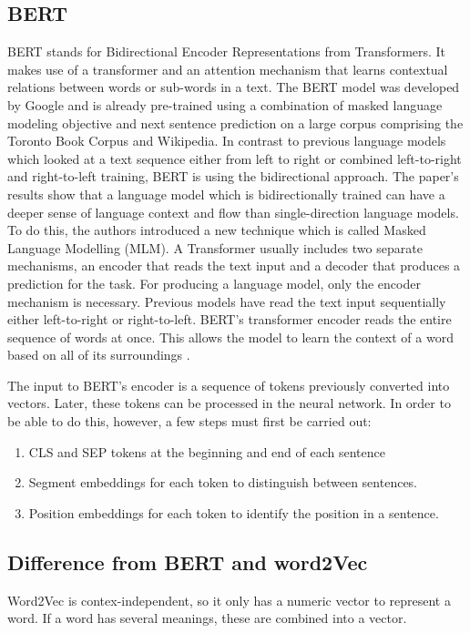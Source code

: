 \subsection{BERT} \label{bert}
BERT  stands  for  Bidirectional Encoder Representations from Transformers.  It makes use of a transformer and an attention mechanism that learns contextual relations between words or sub-words in a text.  The BERT model was developed by Google and is already pre-trained using a combination of masked language modeling objective and next sentence prediction on a large corpus comprising the Toronto Book Corpus and Wikipedia. In contrast to previous language models which looked at a text sequence either from left to right or combined left-to-right and right-to-left training, BERT is using the bidirectional approach. The paper’s results show that a language model which is bidirectionally trained can have a deeper sense of language context and flow than single-direction language models. To do this, the authors introduced a new technique which is called Masked Language Modelling (MLM). \newline
A Transformer usually includes two separate mechanisms, an encoder that reads the text input and a decoder that produces a prediction for the task. For producing a language model, only the encoder mechanism is necessary. Previous models have read the text input sequentially either left-to-right or right-to-left. BERT's transformer encoder reads the entire sequence of words at once. This allows the model to learn the context of a word based on all of its surroundings \cite{Devlin}.  \newline

The input to BERT's encoder is a sequence of tokens previously converted into vectors. Later, these tokens can be processed in the neural network. In order to be able to do this, however, a few steps must first be carried out:
\begin{enumerate}
	\item CLS and SEP tokens at the beginning and end of each sentence
	\item Segment embeddings for each token to distinguish between sentences.
	\item Position embeddings for each token to identify the position in a sentence.
\end{enumerate}

\subsection{Difference from BERT and word2Vec}
Word2Vec is contex-independent, so it only has a numeric vector to represent a word. If a word has several meanings, these are combined into a vector.

